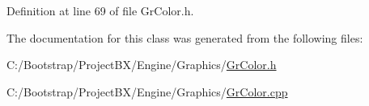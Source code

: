 Definition at line 69 of file GrColor.h.

The documentation for this class was generated from the following files:\begin{CompactItemize}
\item 
C:/Bootstrap/ProjectBX/Engine/Graphics/\hyperlink{_gr_color_8h}{GrColor.h}\item 
C:/Bootstrap/ProjectBX/Engine/Graphics/\hyperlink{_gr_color_8cpp}{GrColor.cpp}\end{CompactItemize}
